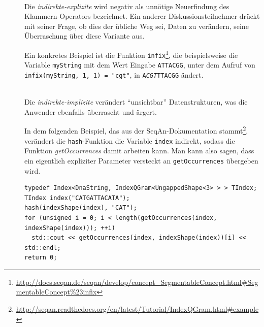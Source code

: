 \begin{itemize}
\begin{description}
    \begin{description}
      \item[] \textbf{} \\
      Die \textit{indirekte-explizite}  wird negativ als unnötige Neuerfindung des Klammern-Operators bezeichnet. Ein anderer Diskussionsteilnehmer drückt mit seiner Frage, ob dies der übliche Weg sei, Daten zu verändern, seine Überraschung über diese Variante aus.
      
      Ein konkretes Beispiel ist die Funktion \texttt{infix}\footnote{\url{http://docs.seqan.de/seqan/develop/concept_SegmentableConcept.html\#SegmentableConcept\%23infix}}, die beispielsweise die Variable \texttt{myString} mit dem Wert Eingabe \texttt{ATTACGG}, unter dem Aufruf von \texttt{infix(myString, 1, 1) = "cgt"}, in \texttt{A\textit{CGT}TTACGG} ändert.
      
      \item[] \textbf{} \\
      Die \textit{indirekte-implizite}  verändert ``unsichtbar'' Datenstrukturen, was die Anwender ebenfalls überrascht und ärgert.
      
      In dem folgenden Beispiel, das aus der SeqAn-Dokumentation stammt\footnote{\url{http://seqan.readthedocs.org/en/latest/Tutorial/IndexQGram.html\#example}}, verändert die \texttt{hash}-Funktion die Variable \texttt{index} indirekt, sodass die Funktion \textit{getOccurrences} damit arbeiten kann. Man kann also sagen, dass ein eigentlich expliziter Parameter versteckt an \texttt{getOccurrences} übergeben wird.
      
      \begin{verbatim}
typedef Index<DnaString, IndexQGram<UngappedShape<3> > > TIndex;
TIndex index("CATGATTACATA");
hash(indexShape(index), "CAT");
for (unsigned i = 0; i < length(getOccurrences(index, indexShape(index))); ++i)
  std::cout << getOccurrences(index, indexShape(index))[i] << std::endl; 
return 0;
      \end{verbatim}
      

\end{description}
\end{description}
\end{itemize}
